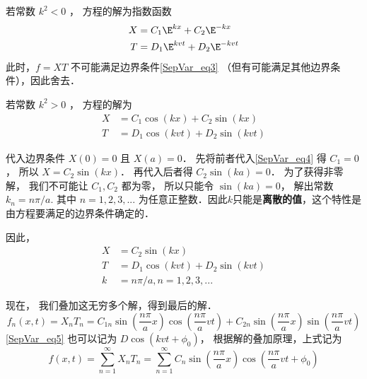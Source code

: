 若常数 $k^2 < 0$ ， 方程的解为指数函数
\begin{align}
X &= C_1 \E^{kx} + C_2 \E^{-kx}\\
T &= D_1 \E^{kvt} + D_2 \E^{-kvt}
\end{align}
此时，$f = XT$ 不可能满足边界条件\autoref{SepVar_eq3}  （但有可能满足其他边界条件），因此舍去．

若常数 $k^2 > 0$ ， 方程的解为
\begin{align}\label{SepVar_eq4}
X &= C_1 \cos(kx) + C_2 \sin(kx)\\
\label{SepVar_eq5}T &= D_1 \cos(kvt) + D_2 \sin(kvt)
\end{align}

代入边界条件 $X(0) = 0$ 且 $X(a) = 0$． 先将前者代入\autoref{SepVar_eq4} 得 $C_1 = 0$， 所以 $X = C_2\sin(kx)$． 再代入后者得 $C_2\sin(ka) = 0$． 为了获得非零解， 我们不可能让 $C_1, C_2$ 都为零， 所以只能令 $\sin(ka) = 0$， 解出常数 $k_n = n\pi/a$. 其中 $n=1,2,3,...$ 为任意正整数．因此$k$只能是\textbf{离散的值}，这个特性是由方程要满足的边界条件确定的．

因此，
\begin{align}
X &= C_2 \sin(kx)\\
T &= D_1 \cos(kvt) + D_2 \sin(kvt)\\
k & = n\pi/a, n=1,2,3,...
\end{align}

现在， 我们叠加这无穷多个解，得到最后的解．
\begin{equation}
f_n(x, t) = X_n T_n = C_{1n} \sin(\frac{n\pi}{a}x)\cos(\frac{n\pi}{a} vt) + C_{2n}\sin(\frac{n\pi}{a}x)\sin(\frac{n\pi}{a}vt)
\end{equation}
\autoref{SepVar_eq5} 也可以记为 $D\cos(kvt+\phi_0)$， 根据解的叠加原理，上式记为
\begin{equation}
f(x, t) = \sum_{n=1}^\infty X_nT_n = \sum_{n=1}^\infty C_n\sin(\frac{n\pi}{a}x)\cos(\frac{n\pi}{a}vt + \phi_0)
\end{equation}

